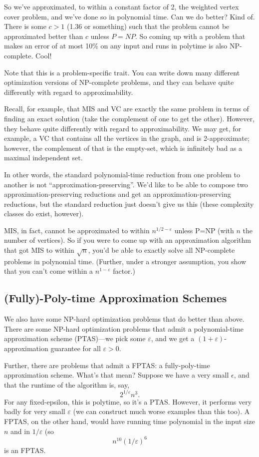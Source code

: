 \documentclass{article}
\begin{document}
So we've approximated, to within a constant factor of 2, the weighted
vertex cover problem, and we've done so in polynomial time.
Can we do better? 
Kind of.
There is some $c > 1$ (1.36 or something) such that the problem cannot
be approximated better than $c$ unless $P=NP$.
So coming up with a problem that makes an error of at most 10\% on any input
and runs in polytime is also NP-complete. Cool!

Note that this is a problem-specific trait. You can write down many different
optimization versions of NP-complete problems, and they can behave quite 
differently with regard to approximability.

Recall, for example, that MIS and VC are exactly the same problem in terms
of finding an exact solution (take the complement of one to get the other).
However, they behave quite differently with regard to approximability.
We may get, for example, a VC that contains all the vertices in the graph,
and is 2-approximate; however, the complement of that is the empty-set, which
is infinitely bad as a maximal independent set.

In other words, the standard polynomial-time reduction from one problem 
to another is not ``approximation-preserving''.
We'd like to be able to compose two approximation-preserving reductions
and get an approximation-preserving reductions, but the standard 
reduction just doesn't give us this (these complexity classes do exist, 
however).

MIS, in fact, cannot be approximated to within $n^{1/2 - \varepsilon}$
unless P=NP (with $n$ the number of vertices). So if you were to come up
with an approximation algorithm that got MIS to within $\sqrt n$, you'd
be able to exactly solve all NP-complete problems in polynomial time.
(Further, under a stronger assumption, you show that you can't come
within a $n^{1-\varepsilon}$ factor.)

\subsection{(Fully)-Poly-time Approximation Schemes}


We also have some NP-hard optimization problems that do better than above.
There are some NP-hard optimization problems that admit a polynomial-time
approximation scheme (PTAS)---we pick some $\varepsilon$, and we get
a $(1 + \varepsilon)$-approximation guarantee for all $\varepsilon > 0$.

Further, there are problems that admit a FPTAS: a fully-poly-time approximation
scheme.
What's that mean? 
Suppose we have a very small $\epsilon$,
and that the runtime of the algorithm is, say,
$$
2^{1/\varepsilon} n^3.
$$
For any fixed-epsilon, this is polytime, so it's a PTAS. However, it performs
very badly for very small $\varepsilon$ (we can construct much worse 
examples than this too).
A FPTAS, on the other hand, would have running time polynomial in
the input size $n$ and in $1/\varepsilon$ (so
$$
n^{10} (1/\varepsilon)^6
$$
is an FPTAS.
\end{document}
